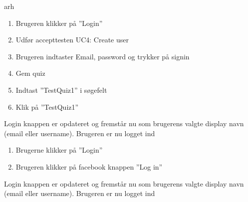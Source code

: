 arh

		{
		\begin{enumerate}
			\item Brugeren klikker på ''Login''
			\item Udfør accepttesten UC4: Create user
			\item Brugeren indtaster Email, password og trykker på signin
			\item Gem quiz
			\item Indtast ''TestQuiz1'' i søgefelt
			\item Klik på ''TestQuiz1''
		\end{enumerate}
		} %
		{Login knappen er opdateret og fremstår nu som brugerens valgte display navn (email eller username). Brugeren er nu logget ind} %
		{} %
		{} %

		{
		\begin{enumerate}
			\item Brugerne klikker på ''Login''
			\item Brugeren klikker på facebook knappen ''Log in''
		\end{enumerate}
		} %
		{Login knappen er opdateret og fremstår nu som brugerens valgte display navn (email eller username). Brugeren er nu logget ind} %
		{} %
		{} %

